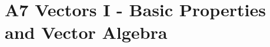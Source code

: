\chapter{A7 Vectors I - Basic Properties and Vector Algebra}\label{sec:A7}


\clearpage

\clearpage
